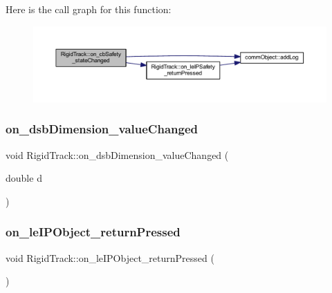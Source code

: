 Here is the call graph for this function\+:
\nopagebreak
\begin{figure}[H]
\begin{center}
\leavevmode
\includegraphics[width=350pt]{class_rigid_track_a8f999fa968f4cc9fa548bdc8438b32c4_cgraph}
\end{center}
\end{figure}
\mbox{\label{class_rigid_track_ae5e44de9f4e3cacdd647c0305936b02b}} 
\subsubsection{\texorpdfstring{on\+\_\+dsb\+Dimension\+\_\+value\+Changed}{on\_dsbDimension\_valueChanged}}
{\footnotesize\ttfamily void Rigid\+Track\+::on\+\_\+dsb\+Dimension\+\_\+value\+Changed (\begin{DoxyParamCaption}\item[{double}]{d }\end{DoxyParamCaption})\hspace{0.3cm}{\ttfamily [slot]}}

\mbox{\label{class_rigid_track_a9f037a061b2577815fc80e5e9f8d46d9}} 
\subsubsection{\texorpdfstring{on\+\_\+le\+I\+P\+Object\+\_\+return\+Pressed}{on\_leIPObject\_returnPressed}}
{\footnotesize\ttfamily void Rigid\+Track\+::on\+\_\+le\+I\+P\+Object\+\_\+return\+Pressed (\begin{DoxyParamCaption}{ }\end{DoxyParamCaption})\hspace{0.3cm}{\ttfamily [slot]}}

